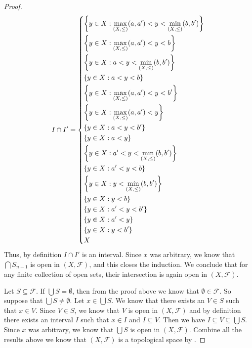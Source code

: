 \begin{proof}
  \[
    I \cap I' = \begin{dcases}
      \left\lbrace y \in X : \max_{(X, \leq)}(a, a') < y < \min_{(X, \leq)}(b, b')\right\rbrace \\
      \left\lbrace y \in X : \max_{(X, \leq)}(a, a') < y < b\right\rbrace                       \\
      \left\lbrace y \in X : a < y < \min_{(X, \leq)}(b, b')\right\rbrace                       \\
      \left\lbrace y \in X : a < y < b\right\rbrace                                             \\
      \left\lbrace y \in X : \max_{(X, \leq)}(a, a') < y < b'\right\rbrace                      \\
      \left\lbrace y \in X : \max_{(X, \leq)}(a, a') < y\right\rbrace                           \\
      \left\lbrace y \in X : a < y < b'\right\rbrace                                            \\
      \left\lbrace y \in X : a < y\right\rbrace                                                 \\
      \left\lbrace y \in X : a' < y < \min_{(X, \leq)}(b, b')\right\rbrace                      \\
      \left\lbrace y \in X : a' < y < b\right\rbrace                                            \\
      \left\lbrace y \in X : y < \min_{(X, \leq)}(b, b')\right\rbrace                           \\
      \left\lbrace y \in X : y < b\right\rbrace                                                 \\
      \left\lbrace y \in X : a' < y < b'\right\rbrace                                           \\
      \left\lbrace y \in X : a' < y\right\rbrace                                                \\
      \left\lbrace y \in X : y < b'\right\rbrace                                                \\
      X
    \end{dcases}
  \]
  Thus, by definition \(I \cap I'\) is an interval.
  Since \(x\) was arbitrary, we know that \(\bigcap S_{n + 1}\) is open in \((X, \mathcal{F})\), and this closes the induction.
  We conclude that for any finite collection of open sets, their intersection is again open in \((X, \mathcal{F})\).

  Let \(S \subseteq \mathcal{F}\).
  If \(\bigcup S = \emptyset\), then from the proof above we know that \(\emptyset \in \mathcal{F}\).
  So suppose that \(\bigcup S \neq \emptyset\).
  Let \(x \in \bigcup S\).
  We know that there exists an \(V \in S\) such that \(x \in V\).
  Since \(V \in S\), we know that \(V\) is open in \((X, \mathcal{F})\) and by definition there exists an interval \(I\) such that \(x \in I\) and \(I \subseteq V\).
  Then we have \(I \subseteq V \subseteq \bigcup S\).
  Since \(x\) was arbitrary, we know that \(\bigcup S\) is open in \((X, \mathcal{F})\).
  Combine all the results above we know that \((X, \mathcal{F})\) is a topological space by .


\end{proof}
